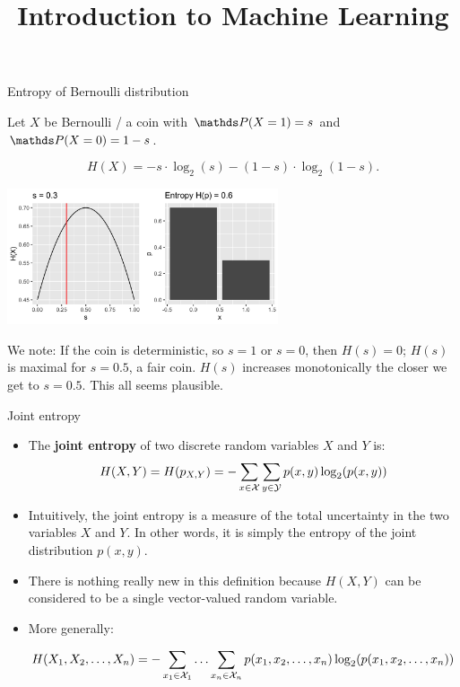 \documentclass[11pt,compress,t,notes=noshow, xcolor=table]{beamer}
\title{Introduction to Machine Learning}
\date{}
\begin{document}

\begin{vbframe}{Entropy of Bernoulli distribution}

Let $X$ be Bernoulli / a coin with $\P(X=1) = s$ and $\P(X=0) = 1 - s$.

$$ H(X)= -s \cdot \log_2(s)-(1-s)\cdot \log_2(1-s). $$

\begin{center}
\includegraphics[width = 8.0cm ]{figure/entropy_bernoulli.png} \\
\end{center}

We note: If the coin is deterministic, so $s=1$ or $s=0$, then $H(s)=0$; 
$H(s)$ is maximal for $s = 0.5$, a fair coin. 
$H(s)$ increases monotonically the closer we get to $s=0.5$.
This all seems plausible.

\end{vbframe}

\begin{vbframe} {Joint entropy}
\begin{itemize}
  \item The \textbf{joint entropy} of two discrete random variables $X$ and $Y$ is:
    $$ H(X,Y) = H(p_{X,Y}) = - \sum_{x \in \mathcal{X}} \sum_{y \in \mathcal{Y}}  p(x,y) \log_2(p(x,y))$$
  \item Intuitively, the joint entropy is a measure of the total uncertainty in the two variables $X$ and $Y$. In other words, it is simply the entropy of the joint distribution $p(x,y)$.
  \item There is nothing really new in this definition because $H(X, Y)$ can be considered to be a single vector-valued random variable.
  \item More generally:
    \begin{footnotesize}  
  $$ H(X_1, X_2, \ldots, X_n) = - \sum_{x_1 \in \mathcal{X}_1} \ldots \sum_{x_n \in \mathcal{X}_n} p(x_1,x_2, \ldots, x_n) \log_2(p(x_1,x_2, \ldots, x_n)) $$ 
    \end{footnotesize}  
\end{itemize}
\end{vbframe}
\end{document}
